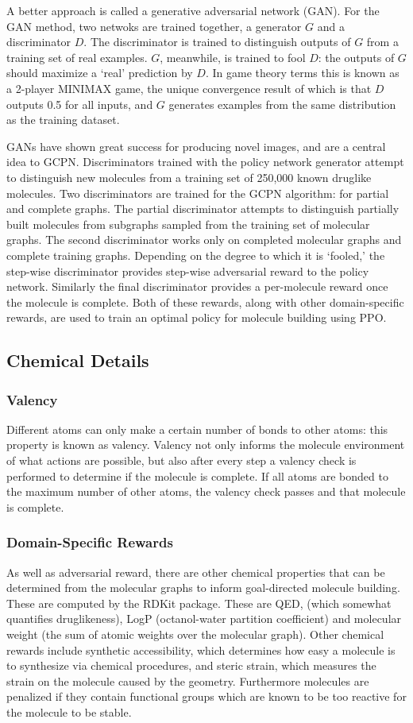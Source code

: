 \documentclass{article}
\begin{document}
A better approach is called a generative adversarial network (GAN). For the GAN method, two netwoks are trained together, a generator $G$ and a discriminator $D$. The discriminator is trained to distinguish outputs of $G$ from a training set of real examples. $G$, meanwhile, is trained to fool $D$: the outputs of $G$ should maximize a `real' prediction by $D$. In game theory terms this is known as a 2-player MINIMAX game, the unique convergence result of which is that $D$ outputs 0.5 for all inputs, and $G$ generates examples from the same distribution as the training dataset.

GANs have shown great success for producing novel images, and are a central idea to GCPN. Discriminators trained with the policy network generator attempt to distinguish new molecules from a training set of 250,000 known druglike molecules. Two discriminators are trained for the GCPN algorithm: for partial and complete graphs. The partial discriminator attempts to distinguish partially built molecules from subgraphs sampled from the training set of molecular graphs. The second discriminator works only on completed molecular graphs and complete training graphs. Depending on the degree to which it is `fooled,' the step-wise discriminator provides step-wise adversarial reward to the policy network. Similarly the final discriminator provides a per-molecule reward once the molecule is complete. Both of these rewards, along with other domain-specific rewards, are used to train an optimal policy for molecule building using PPO.

\subsection{Chemical Details}
\subsubsection*{Valency}
Different atoms can only make a certain number of bonds to other atoms: this property is known as valency. Valency not only informs the molecule environment of what actions are possible, but also after every step a valency check is performed to determine if the molecule is complete. If all atoms are bonded to the maximum number of other atoms, the valency check passes and that molecule is complete.

\subsubsection*{Domain-Specific Rewards}
As well as adversarial reward, there are other chemical properties that can be determined from the molecular graphs to inform goal-directed molecule building. These are computed by the RDKit package. These are QED, (which somewhat quantifies druglikeness), LogP (octanol-water partition coefficient) and molecular weight (the sum of atomic weights over the molecular graph). Other chemical rewards include synthetic accessibility, which determines how easy a molecule is to synthesize via chemical procedures, and steric strain, which measures the strain on the molecule caused by the geometry. Furthermore molecules are penalized if they contain functional groups which are known to be too reactive for the molecule to be stable.
\end{document}
